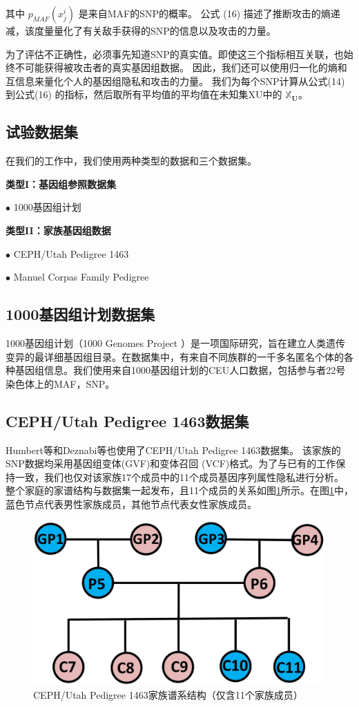 其中 $p_{MAF}(x^i_j)$ 是来自MAF的SNP的概率。 公式 (16) 描述了推断攻击的熵递减，该度量量化了有关敌手获得的SNP的信息以及攻击的力量。

为了评估不正确性，必须事先知道SNP的真实值。即使这三个指标相互关联，也始终不可能获得被攻击者的真实基因组数据。 因此，我们还可以使用归一化的熵和互信息来量化个人的基因组隐私和攻击的力量。
我们为每个SNP计算从公式(14) 到公式(16) 的指标，然后取所有平均值的平均值在未知集XU中的 $\mathbb{X}_{\mathbf{U}}$。


\subsection{试验数据集}

在我们的工作中，我们使用两种类型的数据和三个数据集。

\textbf{类型I：基因组参照数据集}

$\bullet$ 1000基因组计划


\textbf{类型II：家族基因组数据}


$\bullet$ CEPH/Utah Pedigree 1463 

$\bullet$ Manuel Corpas Family Pedigree 

\subsection{1000基因组计划数据集}

1000基因组计划（1000 Genomes Project ）是一项国际研究，旨在建立人类遗传变异的最详细基因组目录。在数据集中，有来自不同族群的一千多名匿名个体的各种基因组信息。我们使用来自1000基因组计划的CEU人口数据，包括参与者22号染色体上的MAF，SNP。

\subsection{CEPH/Utah Pedigree 1463数据集}

Humbert等\cite{humbert2013addressing,humbert2017quantifying}和Deznabi等\cite{deznabi2018inference}也使用了CEPH/Utah Pedigree 1463数据集\cite{drmanac2010human}。
该家族的SNP数据均采用基因组变体(GVF)和变体召回 (VCF)格式。为了与已有的工作保持一致，我们也仅对该家族17个成员中的11个成员基因序列属性隐私进行分析。 整个家庭的家谱结构与数据集一起发布，且11个成员的关系如图\ref{fig:CEPH-Utah-Pedigree}所示。在图\ref{fig:CEPH-Utah-Pedigree}中，蓝色节点代表男性家族成员，其他节点代表女性家族成员。

\begin{figure}[htbp]
	\centering
	\includegraphics[width=0.6\linewidth]{./figures/CEPH-Utah-Pedigree.jpg}
	\centering
	\caption{CEPH/Utah Pedigree 1463家族谱系结构（仅含11个家族成员）}\label{fig:CEPH-Utah-Pedigree}
\end{figure}

